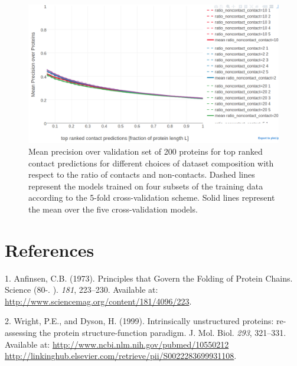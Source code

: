 \documentclass[12pt,a4paper,twoside]{book}
\theoremstyle{definition}
\theoremstyle{definition}
\theoremstyle{remark}
\begin{document}
\begin{figure}

{\centering \includegraphics[width=0.9\linewidth]{img/random_forest_contact_prior/cross_validation/precision_vs_rank_cv_on_test_random_forest_nestimators1000_maxfeatureslog2_maxdepth10_minsamplesleaf100_ratio} 

}

\caption{Mean precision over
validation set of 200 proteins for top ranked contact predictions for
different choices of dataset composition with respect to the ratio of
contacts and non-contacts. Dashed lines represent the models trained on
four subsets of the training data according to the 5-fold
cross-validation scheme. Solid lines represent the mean over the five
cross-validation models.}\label{fig:random-forest-rationoncontactthr-cv}
\end{figure}

\backmatter

\listoffigures
{}

\listoftables
{}

\chapter*{References}\label{references}

\hypertarget{refs}{}
\hypertarget{ref-Anfinsen1973}{}
1. Anfinsen, C.B. (1973). Principles that Govern the Folding of Protein
Chains. Science (80-. ). \emph{181}, 223--230. Available at:
\url{http://www.sciencemag.org/content/181/4096/223}.

\hypertarget{ref-Wright1999}{}
2. Wright, P.E., and Dyson, H. (1999). Intrinsically unstructured
proteins: re-assessing the protein structure-function paradigm. J. Mol.
Biol. \emph{293}, 321--331. Available at:
\href{http://www.ncbi.nlm.nih.gov/pubmed/10550212\%20http://linkinghub.elsevier.com/retrieve/pii/S0022283699931108}{http://www.ncbi.nlm.nih.gov/pubmed/10550212 http://linkinghub.elsevier.com/retrieve/pii/S0022283699931108}.
\end{document}

